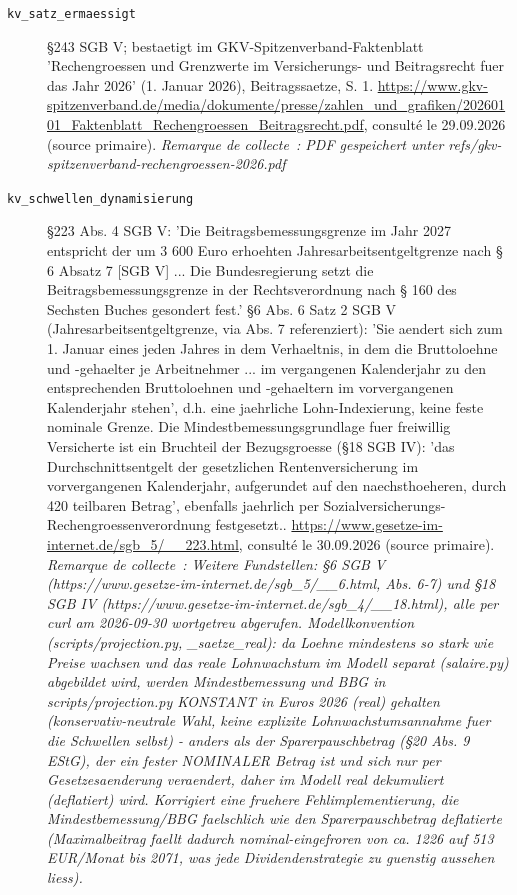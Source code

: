 \begin{description}
\item[\texttt{kv\_satz\_ermaessigt}] \label{src:kv_satz_ermaessigt} §243 SGB V; bestaetigt im GKV-Spitzenverband-Faktenblatt 'Rechengroessen und Grenzwerte im Versicherungs- und Beitragsrecht fuer das Jahr 2026' (1. Januar 2026), Beitragssaetze, S. 1. \url{https://www.gkv-spitzenverband.de/media/dokumente/presse/zahlen_und_grafiken/20260101_Faktenblatt_Rechengroessen_Beitragsrecht.pdf}, consulté le 29.09.2026 (source primaire). \textit{Remarque de collecte~: PDF gespeichert unter refs/gkv-spitzenverband-rechengroessen-2026.pdf}
\item[\texttt{kv\_schwellen\_dynamisierung}] \label{src:kv_schwellen_dynamisierung} §223 Abs. 4 SGB V: 'Die Beitragsbemessungsgrenze im Jahr 2027 entspricht der um 3 600 Euro erhoehten Jahresarbeitsentgeltgrenze nach § 6 Absatz 7 [SGB V] ... Die Bundesregierung setzt die Beitragsbemessungsgrenze in der Rechtsverordnung nach § 160 des Sechsten Buches gesondert fest.' §6 Abs. 6 Satz 2 SGB V (Jahresarbeitsentgeltgrenze, via Abs. 7 referenziert): 'Sie aendert sich zum 1. Januar eines jeden Jahres in dem Verhaeltnis, in dem die Bruttoloehne und -gehaelter je Arbeitnehmer ... im vergangenen Kalenderjahr zu den entsprechenden Bruttoloehnen und -gehaeltern im vorvergangenen Kalenderjahr stehen', d.h. eine jaehrliche Lohn-Indexierung, keine feste nominale Grenze. Die Mindestbemessungsgrundlage fuer freiwillig Versicherte ist ein Bruchteil der Bezugsgroesse (§18 SGB IV): 'das Durchschnittsentgelt der gesetzlichen Rentenversicherung im vorvergangenen Kalenderjahr, aufgerundet auf den naechsthoeheren, durch 420 teilbaren Betrag', ebenfalls jaehrlich per Sozialversicherungs-Rechengroessenverordnung festgesetzt.. \url{https://www.gesetze-im-internet.de/sgb_5/__223.html}, consulté le 30.09.2026 (source primaire). \textit{Remarque de collecte~: Weitere Fundstellen: §6 SGB V (https://www.gesetze-im-internet.de/sgb\_5/\_\_6.html, Abs. 6-7) und §18 SGB IV (https://www.gesetze-im-internet.de/sgb\_4/\_\_18.html), alle per curl am 2026-09-30 wortgetreu abgerufen. Modellkonvention (scripts/projection.py, \_saetze\_real): da Loehne mindestens so stark wie Preise wachsen und das reale Lohnwachstum im Modell separat (salaire.py) abgebildet wird, werden Mindestbemessung und BBG in scripts/projection.py KONSTANT in Euros 2026 (real) gehalten (konservativ-neutrale Wahl, keine explizite Lohnwachstumsannahme fuer die Schwellen selbst) - anders als der Sparerpauschbetrag (§20 Abs. 9 EStG), der ein fester NOMINALER Betrag ist und sich nur per Gesetzesaenderung veraendert, daher im Modell real dekumuliert (deflatiert) wird. Korrigiert eine fruehere Fehlimplementierung, die Mindestbemessung/BBG faelschlich wie den Sparerpauschbetrag deflatierte (Maximalbeitrag faellt dadurch nominal-eingefroren von ca. 1226 auf 513 EUR/Monat bis 2071, was jede Dividendenstrategie zu guenstig aussehen liess).}

\end{description}
